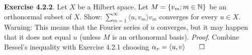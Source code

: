 {\bf Exercise 4.2.2}. Let $X$ be a Hilbert space. Let $M=\{v_m;m\in \mathbb{N}\}$ be an orthonormal subset of $X$. Show: $\sum_{m=1}^{\infty} \langle u,v_m\rangle v_m$ converges for every $u \in X$. Warning: This means that the Fourier series of $u$ converges, but it may happen that it does not equal $u$ (unless $M$ is an orthonormal basis). {\it Proof}. Combine Bessel's inequality with Exercise 4.2.1 choosing $\alpha_v = \langle u,v \rangle \qed$ 